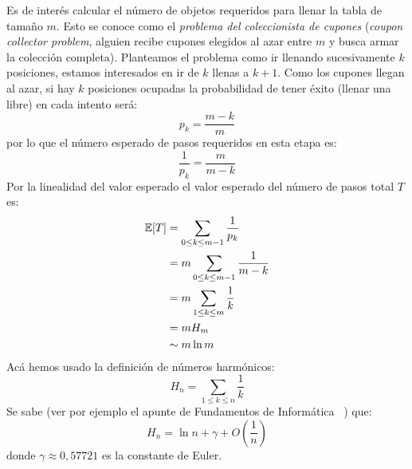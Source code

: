   Es de interés calcular el número de objetos requeridos
  para llenar la tabla de tamaño \(m\).
  Esto se conoce como el \emph{problema del coleccionista de cupones}
  (\emph{\foreignlanguage{english}{coupon collector problem}},
   alguien recibe cupones elegidos al azar entre \(m\)
   y busca armar la colección completa).
  Planteamos el problema como ir llenando sucesivamente \(k\) posiciones,
  estamos interesados en ir de \(k\) llenas a \(k + 1\).
  Como los cupones llegan al azar,
  si hay \(k\) posiciones ocupadas la probabilidad de tener éxito
  (llenar una libre)
  en cada intento será:
  \begin{equation*}
    p_k
      = \frac{m - k}{m}
  \end{equation*}
  por lo que el número esperado de pasos
  requeridos en esta etapa es:
  \begin{equation*}
    \frac{1}{p_k}
      = \frac{m}{m - k}
  \end{equation*}
  Por la linealidad del valor esperado
  el valor esperado del número de pasos total \(T\) es:
  \begin{align*}
    \operatorname{\mathbb{E}}[T]
      &=    \sum_{0 \le k \le m - 1} \frac{1}{p_k} \\
      &=    m \sum_{0 \le k \le m - 1} \frac{1}{m - k} \\
      &=    m \sum_{1 \le k \le m} \frac{1}{k} \\
      &=    m H_m \\
      &\sim m \ln m
  \end{align*}
  Acá hemos usado la definición de números harmónicos:
  \begin{equation*}
    H_n
      = \sum_{1 \le k \le n} \frac{1}{k}
  \end{equation*}
  Se sabe
  (ver por ejemplo el apunte de Fundamentos de Informática~%
    \cite[capítulo~18]{brand17:_fundamentos_informatica})
  que:
  \begin{equation*}
    H_n
      = \ln n + \gamma + O\left( \frac{1}{n} \right)
  \end{equation*}
  donde \(\gamma \approx 0,57721\) es la constante de Euler.

